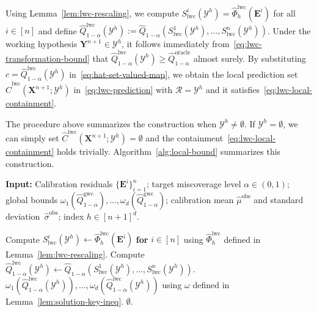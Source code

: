 Using Lemma~\ref{lem:lwc-rescaling}, we compute $S^i_{\mathrm{lwc}}(\mathcal{Y}^h)= \hat{\Phi}^{\mathrm{lwc}}_h(\mathbf{E}^i)$ for all $i\in [n]$ and define $\hat{Q}^{\mathrm{lwc}}_{1-\alpha}(\mathcal{Y}^h):= \hat{Q}_{1-\alpha}(S^1_{\mathrm{lwc}}(\mathcal{Y}^h), \ldots, S^n_{\mathrm{lwc}}(\mathcal{Y}^h))$. Under the working hypothesis $\mathbf{Y}^{n+1} \in \mathcal{Y}^h$, it follows immediately from~\eqref{eq:lwc-transformation-bound} that 
$\hat{Q}^{\mathrm{lwc}}_{1-\alpha}(\mathcal{Y}^h)\ge \hat{Q}^{\mathrm{oracle}}_{1-\alpha}$ almost surely.
By substituting $c = \hat{Q}^{\mathrm{lwc}}_{1-\alpha}(\mathcal{Y}^h)$ in~\eqref{eq:hat-set-valued-map}, we obtain the local prediction set $\hat{C}^{\mathrm{lwc}}(\mathbf{X}^{n+1};\mathcal{Y}^h)$ in~\eqref{eq:lwc-prediction} with $\mathcal{R} = \mathcal{Y}^h$ and it satisfies~\eqref{eq:lwc-local-containment}.

The procedure above summarizes the construction when $\mathcal{Y}^h \neq \emptyset$.
If $\mathcal{Y}^h = \emptyset$, we can simply set $\hat{C}^{\mathrm{lwc}}(\mathbf{X}^{n+1};\mathcal{Y}^h) = \emptyset$ and the containment~\eqref{eq:lwc-local-containment} holds trivially. 
Algorithm~\ref{alg:local-bound} summarizes this construction. 

\begin{algorithm}[!htbp] 
\caption{Construction of local prediction sets under working hypothesis $\mathbf{Y}^{n+1} \in \mathcal{Y}^h$} \label{alg:local-bound} 
\textbf{Input:} Calibration residuals $\{\mathbf{E}^i\}_{i=1}^{n}$; target miscoverage level $\alpha\in(0,1)$; global bounds $\omega_1(\hat{Q}^{\mathrm{gwc}}_{1-\alpha}),\ldots,\omega_d(\hat{Q}^{\mathrm{gwc}}_{1-\alpha})$; calibration mean $\hat{\mu}^\mathrm{obs}$ and standard deviation\ $\hat{\sigma}^\mathrm{obs}$; index $h\in [n+1]^d$.
\begin{algorithmic}[1] 
    \State Compute $S_{\mathrm{lwc}}^i(\mathcal{Y}^h) \gets \hat{\Phi}^{\mathrm{lwc}}_h(\mathbf{E}^i)$ \textbf{for} $i \in [n]$ using $\hat{\Phi}^{\mathrm{lwc}}_h$ defined in Lemma~\ref{lem:lwc-rescaling}.
    \State Compute $\hat{Q}^{\mathrm{lwc}}_{1-\alpha}(\mathcal{Y}^h) \gets \hat{Q}_{1-\alpha}(S_{\mathrm{lwc}}^1(\mathcal{Y}^h),\ldots,S_{\mathrm{lwc}}^n(\mathcal{Y}^h))$. 
    \State \Return $\omega_1(\hat{Q}^{\mathrm{lwc}}_{1-\alpha}(\mathcal{Y}^h)),\ldots,\omega_d(\hat{Q}^{\mathrm{lwc}}_{1-\alpha}(\mathcal{Y}^h))$ using $\omega$ defined in Lemma~\ref{lem:solution-key-ineq}.
\Else
\State \Return $\emptyset$.
\EndIf 
\end{algorithmic} 
\end{algorithm}

